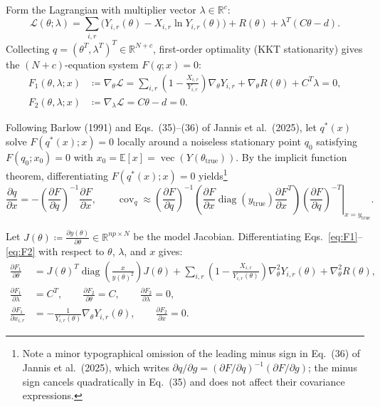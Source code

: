 \documentclass[11pt,a4paper]{article}
\theoremstyle{plain}
\theoremstyle{definition}
\theoremstyle{remark}
\newcommand{\R}{\mathbb{R}}
\newcommand{\cL}{\mathcal{L}}
\newcommand{\vecop}{\operatorname{vec}}
\newcommand{\diag}{\operatorname{diag}}
\newcommand{\cov}{\operatorname{cov}}
\begin{document}
Form the Lagrangian with multiplier vector $\lambda \in \R^c$:
\begin{equation}
\label{eq:lagrangian}
\cL(\theta; \lambda) = \sum_{i,r} \big( Y_{i,r}(\theta) - X_{i,r} \ln Y_{i,r}(\theta) \big) + R(\theta) + \lambda^T (C\theta - d).
\end{equation}
Collecting $q = (\theta^T, \lambda^T)^T \in \R^{N+c}$, first-order optimality (KKT stationarity) gives the $(N+c)$-equation system $F(q; x) = 0$:
\begin{align}
F_1(\theta,\lambda; x) &\coloneqq \nabla_\theta \cL = \sum_{i,r} \left( 1 - \frac{X_{i,r}}{Y_{i,r}} \right) \nabla_\theta Y_{i,r} + \nabla_\theta R(\theta) + C^T \lambda = 0, \label{eq:F1}\\
F_2(\theta,\lambda; x) &\coloneqq \nabla_\lambda \cL = C\theta - d = 0. \label{eq:F2}
\end{align}

Following Barlow (1991) and Eqs.~(35)--(36) of Jannis et al.\ (2025), let $q^*(x)$ solve $F(q^*(x); x) = 0$ locally around a noiseless stationary point $q_0$ satisfying $F(q_0; x_0) = 0$ with $x_0 = \mathbb{E}[x] = \vecop(Y(\theta_{\text{true}}))$. By the implicit function theorem, differentiating $F(q^*(x); x) = 0$ yields\footnote{Note a minor typographical omission of the leading minus sign in Eq.~(36) of Jannis et al.\ (2025), which writes $\partial q/\partial g = (\partial F/\partial q)^{-1}(\partial F/\partial g)$; the minus sign cancels quadratically in Eq.~(35) and does not affect their covariance expressions.}
\begin{equation}
\label{eq:ift}
\frac{\partial q}{\partial x} = -\left(\frac{\partial F}{\partial q}\right)^{-1} \frac{\partial F}{\partial x}, \qquad
\cov_q \approx \left. \left(\frac{\partial F}{\partial q}\right)^{-1} \left(\frac{\partial F}{\partial x} \diag(y_{\text{true}}) \frac{\partial F}{\partial x}^T\right) \left(\frac{\partial F}{\partial q}\right)^{-T} \right|_{x = y_{\text{true}}}.
\end{equation}

Let $J(\theta) \coloneqq \frac{\partial y(\theta)}{\partial \theta} \in \R^{np \times N}$ be the model Jacobian. Differentiating Eqs.~\eqref{eq:F1}--\eqref{eq:F2} with respect to $\theta$, $\lambda$, and $x$ gives:
\begin{align}
\frac{\partial F_1}{\partial \theta} &= J(\theta)^T \diag\!\left(\frac{x}{y(\theta)^2}\right) J(\theta) + \sum_{i,r} \left( 1 - \frac{X_{i,r}}{Y_{i,r}(\theta)} \right) \nabla^2_\theta Y_{i,r}(\theta) + \nabla^2_\theta R(\theta), \label{eq:dF1_dtheta}\\
\frac{\partial F_1}{\partial \lambda} &= C^T, \qquad \frac{\partial F_2}{\partial \theta} = C, \qquad \frac{\partial F_2}{\partial \lambda} = 0, \\
\frac{\partial F_1}{\partial x_{i,r}} &= -\frac{1}{Y_{i,r}(\theta)} \nabla_\theta Y_{i,r}(\theta), \qquad \frac{\partial F_2}{\partial x} = 0. \label{eq:dF1_dx}
\end{align}
\end{document}

